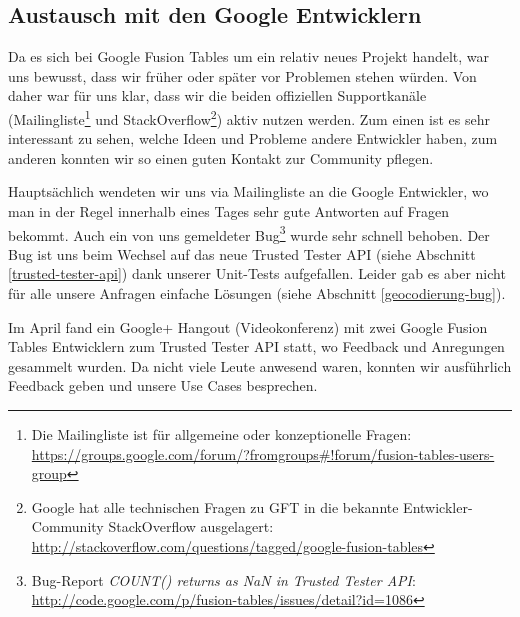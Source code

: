 \subsection{Austausch mit den Google Entwicklern}
\label{austausch-mit-google}
Da es sich bei Google Fusion Tables um ein relativ neues Projekt handelt, war uns bewusst, dass wir früher oder später vor Problemen stehen würden. Von daher war für uns klar, dass wir die beiden offiziellen Supportkanäle (Mailingliste\footnote{Die Mailingliste ist für allgemeine oder konzeptionelle Fragen: \url{https://groups.google.com/forum/?fromgroups\#!forum/fusion-tables-users-group}} und StackOverflow\footnote{Google hat alle technischen Fragen zu GFT in die bekannte Entwickler-Community StackOverflow ausgelagert: \url{http://stackoverflow.com/questions/tagged/google-fusion-tables}}) aktiv nutzen werden. Zum einen ist es sehr interessant zu sehen, welche Ideen und Probleme andere Entwickler haben, zum anderen konnten wir so einen guten Kontakt zur Community pflegen.

Hauptsächlich wendeten wir uns via Mailingliste an die Google Entwickler, wo man in der Regel innerhalb eines Tages sehr gute Antworten auf Fragen bekommt. Auch ein von uns gemeldeter Bug\footnote{Bug-Report \emph{COUNT() returns as NaN in Trusted Tester \gls{API}}: \url{http://code.google.com/p/fusion-tables/issues/detail?id=1086}} wurde sehr schnell behoben. Der Bug ist uns beim Wechsel auf das neue Trusted Tester \gls{API} (siehe Abschnitt \ref{trusted-tester-api}) dank unserer Unit-Tests aufgefallen. Leider gab es aber nicht für alle unsere Anfragen einfache Lösungen (siehe Abschnitt \ref{geocodierung-bug}).

Im April fand ein Google+ Hangout (Videokonferenz) mit zwei Google Fusion Tables Entwicklern zum Trusted Tester \gls{API} statt, wo Feedback und Anregungen gesammelt wurden. Da nicht viele Leute anwesend waren, konnten wir ausführlich Feedback geben und unsere Use Cases besprechen.









